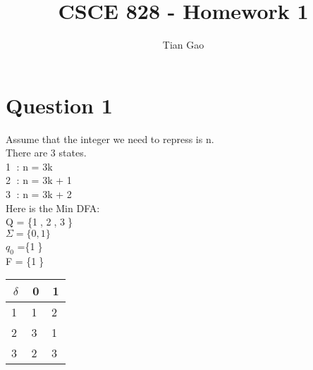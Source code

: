 \documentclass[a4paper]{article}
\title{CSCE 828 - Homework 1}
\author{Tian Gao}
\begin{document}
\maketitle


\section{Question 1}
Assume that the integer we need to repress is n.\\
There are 3 states.\\
\textcircled{1} : n = 3k \\
\textcircled{2} : n = 3k + 1 \\
\textcircled{3} : n = 3k + 2  \\
Here is the Min DFA:\\
Q = \{\textcircled{1}, \textcircled{2}, \textcircled{3}\}\\
$\Sigma = \{0, 1\}$\\
$q_{0}$ =\{\textcircled{1}\}\\
F = \{\textcircled{1}\}\\
\begin{tabular}{|c|c|c|}
\hline
$\delta$ & 0 & 1 \\ 
\hline
\textcircled{1} & \textcircled{1} & \textcircled{2} \\
\hline
\textcircled{2} & \textcircled{3} & \textcircled{1} \\
\hline
\textcircled{3} & \textcircled{2} & \textcircled{3} \\
\hline
\end{tabular}

\end{document}
